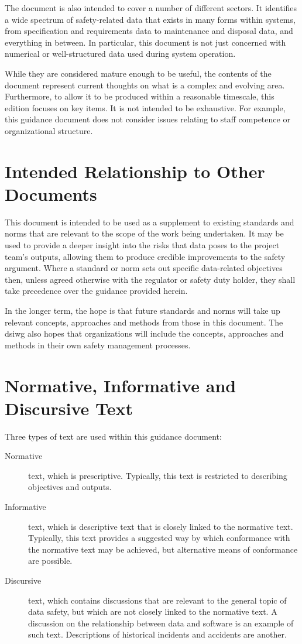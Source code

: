The document is also intended to cover a number of different sectors. It identifies a wide spectrum of safety-related data that exists in many forms within systems, from specification and requirements data to maintenance and disposal data, and everything in between. In particular, this document is not just concerned with numerical or well-structured data used during system operation.

While they are considered mature enough to be useful, the contents of the document represent current thoughts on what is a complex and evolving area. Furthermore, to allow it to be produced within a reasonable timescale, this edition focuses on key items. It is not intended to be exhaustive. For example, this guidance document does not consider issues relating to staff competence or organizational structure.

\section{Intended Relationship to Other Documents}
This document is intended to be used as a supplement to existing standards and norms that are relevant to the scope of the work being undertaken. It may be used to provide a deeper insight into the risks that data poses to the project team's outputs, allowing them to produce credible improvements to the safety argument. Where a standard or norm sets out specific data-related objectives then, unless agreed otherwise with the regulator or safety duty holder, they shall take precedence over the guidance provided herein.

In the longer term, the hope is that future standards and norms will take up relevant concepts, approaches and methods from those in this document. The \gls{dsiwg} also hopes that organizations will include the concepts, approaches and methods in their own safety management processes.

\clearpage %
\section{Normative, Informative and Discursive Text}
Three types of text are used within this guidance document:
\begin{description}
	\item[Normative] text, which is prescriptive. Typically, this text is restricted to describing objectives and outputs.
	\item[Informative] text, which is descriptive text that is closely linked to the normative text. Typically, this text provides a suggested way by which conformance with the normative text may be achieved, but alternative means of conformance are possible.
	\item[Discursive] text, which contains discussions that are relevant to the general topic of data safety, but which are not closely linked to the normative text. A discussion on the relationship between data and software is an example of such text. Descriptions of historical incidents and accidents are another.
\end{description}

